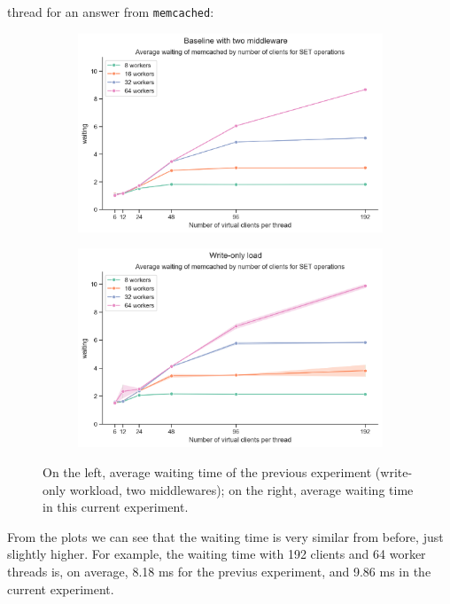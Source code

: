 \documentclass[11pt,a4paper]{article}
\renewcommand{\t}[1]{%
	{\texttt{#1}}}
\begin{document}
\begin{itemize}
		thread for an answer from \t{memcached}:
		\begin{figure}[H]
			\begin{subfigure}[b]{0.5\linewidth}
				\includegraphics[width=\linewidth]{images/writes_1/waiting_middleware_2.pdf}
			\end{subfigure}
			\begin{subfigure}[b]{0.5\linewidth}
				\includegraphics[width=\linewidth]{images/writes_1/last_graph_set_waiting.pdf}
			\end{subfigure}
			\caption{On the left, average waiting time of the previous experiment (write-only workload, two middlewares); on the right, average waiting time in this current experiment.}
			\label{fig:omg}
		\end{figure}
		From the plots we can see that the waiting time is very similar from before,
		just slightly higher. For example, the waiting time with 192 clients
		and 64 worker threads is, on average, 8.18 ms for the previus experiment,
		and 9.86 ms in the current experiment.


\end{itemize}
\end{document}
